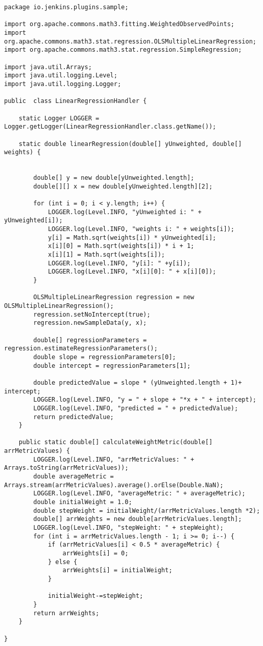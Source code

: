 \begin{lstlisting}
package io.jenkins.plugins.sample;

import org.apache.commons.math3.fitting.WeightedObservedPoints;
import org.apache.commons.math3.stat.regression.OLSMultipleLinearRegression;
import org.apache.commons.math3.stat.regression.SimpleRegression;

import java.util.Arrays;
import java.util.logging.Level;
import java.util.logging.Logger;

public  class LinearRegressionHandler {

    static Logger LOGGER = Logger.getLogger(LinearRegressionHandler.class.getName());

    static double linearRegression(double[] yUnweighted, double[] weights) {


        double[] y = new double[yUnweighted.length];
        double[][] x = new double[yUnweighted.length][2];

        for (int i = 0; i < y.length; i++) {
            LOGGER.log(Level.INFO, "yUnweighted i: " + yUnweighted[i]);
            LOGGER.log(Level.INFO, "weights i: " + weights[i]);
            y[i] = Math.sqrt(weights[i]) * yUnweighted[i];
            x[i][0] = Math.sqrt(weights[i]) * i + 1;
            x[i][1] = Math.sqrt(weights[i]);
            LOGGER.log(Level.INFO, "y[i]: " +y[i]);
            LOGGER.log(Level.INFO, "x[i][0]: " + x[i][0]);
        }

        OLSMultipleLinearRegression regression = new OLSMultipleLinearRegression();
        regression.setNoIntercept(true);
        regression.newSampleData(y, x);

        double[] regressionParameters = regression.estimateRegressionParameters();
        double slope = regressionParameters[0];
        double intercept = regressionParameters[1];

        double predictedValue = slope * (yUnweighted.length + 1)+ intercept;
        LOGGER.log(Level.INFO, "y = " + slope + "*x + " + intercept);
        LOGGER.log(Level.INFO, "predicted = " + predictedValue);
        return predictedValue;
    }

    public static double[] calculateWeightMetric(double[] arrMetricValues) {
        LOGGER.log(Level.INFO, "arrMetricValues: " + Arrays.toString(arrMetricValues));
        double averageMetric = Arrays.stream(arrMetricValues).average().orElse(Double.NaN);
        LOGGER.log(Level.INFO, "averageMetric: " + averageMetric);
        double initialWeight = 1.0;
        double stepWeight = initialWeight/(arrMetricValues.length *2);
        double[] arrWeights = new double[arrMetricValues.length];
        LOGGER.log(Level.INFO, "stepWeight: " + stepWeight);
        for (int i = arrMetricValues.length - 1; i >= 0; i--) {
            if (arrMetricValues[i] < 0.5 * averageMetric) {
                arrWeights[i] = 0;
            } else {
                arrWeights[i] = initialWeight;
            }

            initialWeight-=stepWeight;
        }
        return arrWeights;
    }

}




\end{lstlisting}

